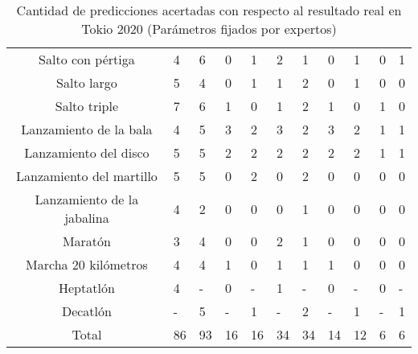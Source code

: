 \begin{table}[H]
{\begin{tabular}{|c|P{1.3cm}|P{1.2cm}|P{1.3cm}|P{1.2cm}|P{1.4cm}|P{1.2cm}|P{1.45cm}|P{1.2cm}|P{1.3cm}|P{1.2cm}|}
            Salto con pértiga & 4 & 6 & 0 & 1 & 2 & 1 & 0 & 1 & 0 & 1 \\
            Salto largo & 5 & 4 & 0 & 1 & 1 & 2 & 0 & 1 & 0 & 0 \\
            Salto triple & 7 & 6 & 1 & 0 & 1 & 2 & 1 & 0 & 1 & 0 \\
            Lanzamiento de la bala & 4 & 5 & 3 & 2 & 3 & 2 & 3 & 2 & 1 & 1 \\
            Lanzamiento del disco & 5 & 5 & 2 & 2 & 2 & 2 & 2 & 2 & 1 & 1 \\
            Lanzamiento del martillo & 5 & 5 & 0 & 2 & 0 & 2 & 0 & 0 & 0 & 0 \\
            Lanzamiento de la jabalina & 4 & 2 & 0 & 0 & 0 & 1 & 0 & 0 & 0 & 0 \\
            Maratón & 3 & 4 & 0 & 0 & 2 & 1 & 0 & 0 & 0 & 0 \\
            Marcha 20 kilómetros & 4 & 4 & 1 & 0 & 1 & 1 & 1 & 0 & 0 & 0 \\
            Heptatlón & 4 & - & 0 & - & 1 & - & 0 & - & 0 & - \\
            Decatlón & - & 5 & - & 1 & - & 2 & - & 1 & - & 1 \\
            \hline
            Total & 86 & 93 & 16 & 16 & 34 & 34 & 14 & 12 & 6 & 6 \\ \hline
        \end{tabular}
        \caption{Cantidad de predicciones acertadas con respecto al resultado real en Tokio 2020 (Parámetros fijados por expertos)}
        \label{tab:manualtokio}
    }
\end{table}

